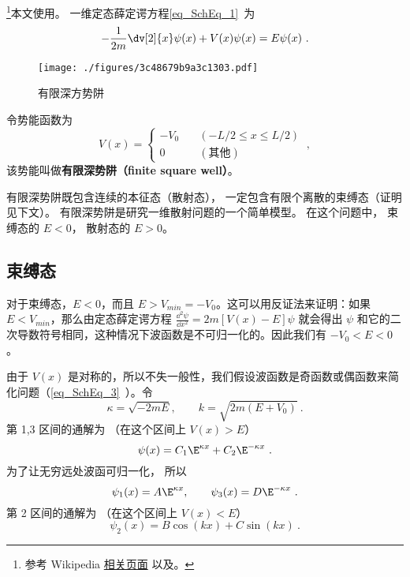 
\begin{issues}
\issueTODO
\end{issues}




\footnote{参考 Wikipedia \href{https://en.wikipedia.org/wiki/Finite_potential_well}{相关页面} 以及\cite{GriffQ}。}本文使用。 一维定态薛定谔方程\autoref{eq_SchEq_1}~为
\begin{equation}
-\frac{1}{2m}\dv[2]{x}\psi(x) + V(x) \psi(x) = E \psi(x)~.
\end{equation}

\begin{figure}[ht]
\centering
\texttt{[image: ./figures/3c48679b9a3c1303.pdf]}
\caption{有限深方势阱} \label{fig_FSW_1}
\end{figure}
令势能函数为
\begin{equation}
V(x) = \begin{cases}
-V_0 \quad &(-L/2 \leqslant x \leqslant L/2)\\
0 \quad &(\text{其他})
\end{cases}~,
\end{equation}
该势能叫做\textbf{有限深势阱（finite square well）}。

有限深势阱既包含连续的本征态（散射态）， 一定包含有限个离散的束缚态（证明见下文）。 有限深势阱是研究一维散射问题的一个简单模型。 在这个问题中， 束缚态的 $E<0$， 散射态的 $E>0$。

\subsection{束缚态}
对于束缚态，$E<0$，而且 $E> V_{min}=-V_0$。这可以用反证法来证明：如果 $E<V_{min}$，那么由定态薛定谔方程 $\frac{\dd {^2}\psi}{\dd x^2}=2m[V(x)-E]\psi$ 就会得出 $\psi$ 和它的二次导数符号相同，这种情况下波函数是不可归一化的。因此我们有 $-V_0<E<0$。

由于 $V(x)$ 是对称的，所以不失一般性，我们假设波函数是奇函数或偶函数来简化问题（\autoref{eq_SchEq_3}~）。令
\begin{equation}\label{eq_FSW_4}
\kappa = \sqrt{-2mE}, \qquad k = \sqrt{2m(E + V_0)}~.
\end{equation}
第 1,3 区间的通解为 （在这个区间上 $V(x) > E$）
\begin{equation}
\psi(x) = C_1 \E^{\kappa x} + C_2 \E^{-\kappa x}~.
\end{equation}
为了让无穷远处波函可归一化， 所以
\begin{equation}
\psi_1(x) = A \E^{\kappa x}, \qquad \psi_3(x) = D\E^{-\kappa x}~.
\end{equation}
第 2 区间的通解为 （在这个区间上 $V(x) < E$）
\begin{equation}
\psi_2(x) = B \cos(k x) + C\sin(k x)~.
\end{equation}

